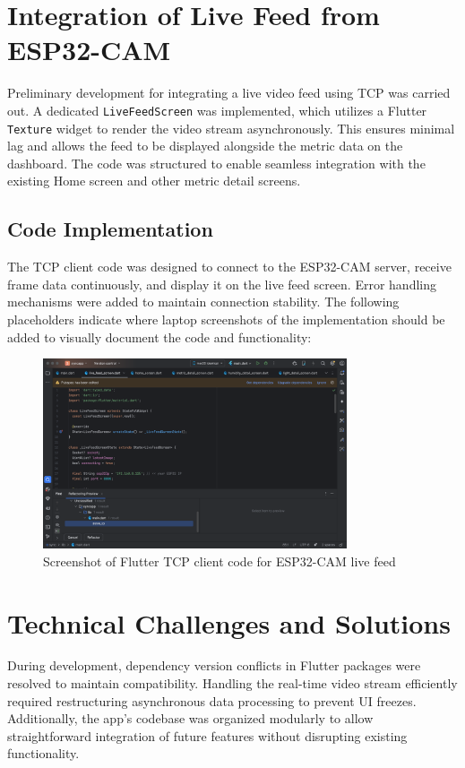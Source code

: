 \documentclass[12pt,a4paper]{report}
\begin{document}
\section{Integration of Live Feed from ESP32-CAM}

Preliminary development for integrating a live video feed using TCP was carried out. A dedicated \texttt{LiveFeedScreen} was implemented, which utilizes a Flutter \texttt{Texture} widget to render the video stream asynchronously. This ensures minimal lag and allows the feed to be displayed alongside the metric data on the dashboard. The code was structured to enable seamless integration with the existing Home screen and other metric detail screens.

\subsection{Code Implementation}

The TCP client code was designed to connect to the ESP32-CAM server, receive frame data continuously, and display it on the live feed screen. Error handling mechanisms were added to maintain connection stability. The following placeholders indicate where laptop screenshots of the implementation should be added to visually document the code and functionality:

\begin{figure}[H]
\centering
\includegraphics[width=0.8\textwidth]{ss.png}
\caption{Screenshot of Flutter TCP client code for ESP32-CAM live feed}
\end{figure}



\section{Technical Challenges and Solutions}

During development, dependency version conflicts in Flutter packages were resolved to maintain compatibility. Handling the real-time video stream efficiently required restructuring asynchronous data processing to prevent UI freezes. Additionally, the app’s codebase was organized modularly to allow straightforward integration of future features without disrupting existing functionality.
\end{document}
